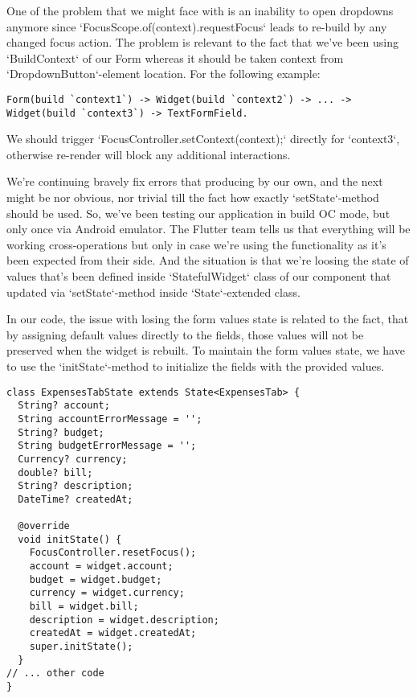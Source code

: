 One of the problem that we might face with is an inability to open dropdowns anymore since 
`FocusScope.of(context).requestFocus` leads to re-build by any changed focus action. The problem is relevant to the
fact that we've been using `BuildContext` of our Form whereas it should be taken context from `DropdownButton`-element 
location. For the following example:

\begin{lstlisting}
Form(build `context1`) -> Widget(build `context2`) -> ... -> Widget(build `context3`) -> TextFormField.
\end{lstlisting}

\noindent We should trigger `FocusController.setContext(context);` directly for `context3`, otherwise re-render will 
block any additional interactions.

We're continuing bravely fix errors that producing by our own, and the next might be nor obvious, nor trivial till 
the fact how exactly `setState`-method should be used. So, we've been testing our application in build OC mode, but 
only once via Android emulator. The Flutter team tells us that everything will be working cross-operations but only 
in case we're using the functionality as it's been expected from their side. And the situation is that we're loosing 
the state of values that's been defined inside `StatefulWidget` class of our component that updated via 
`setState`-method inside `State`-extended class.

In our code, the issue with losing the form values state is related to the fact, that by assigning default values 
directly to the fields, those values will not be preserved when the widget is rebuilt. To maintain the form values 
state, we have to use the `initState`-method to initialize the fields with the provided values.

\begin{lstlisting}
class ExpensesTabState extends State<ExpensesTab> {
  String? account;
  String accountErrorMessage = '';
  String? budget;
  String budgetErrorMessage = '';
  Currency? currency;
  double? bill;
  String? description;
  DateTime? createdAt;

  @override
  void initState() {
    FocusController.resetFocus();
    account = widget.account;
    budget = widget.budget;
    currency = widget.currency;
    bill = widget.bill;
    description = widget.description;
    createdAt = widget.createdAt;
    super.initState();
  }
// ... other code
}
\end{lstlisting}

